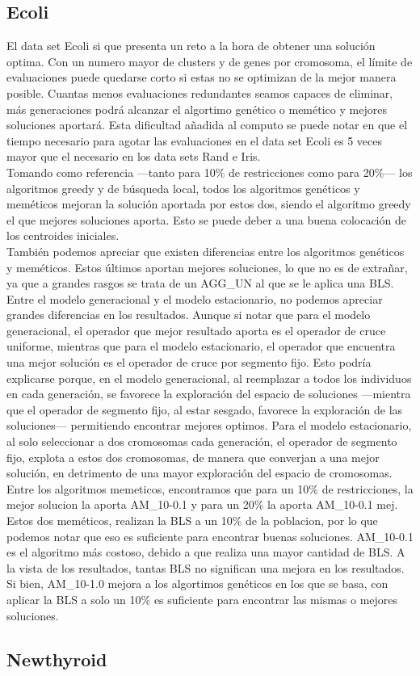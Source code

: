 \subsection{Ecoli}
El data set Ecoli si que presenta un reto a la hora de obtener una solución optima. Con un numero mayor de clusters y de genes por cromosoma, el límite de evaluaciones puede quedarse corto si estas no se optimizan de la mejor manera posible. Cuantas menos evaluaciones redundantes seamos capaces de eliminar, más generaciones podrá alcanzar el algortimo genético o memético y mejores soluciones aportará. Esta dificultad añadida al computo se puede notar en que el tiempo necesario para agotar las evaluaciones en el data set Ecoli es 5 veces mayor que el necesario en los data sets Rand e Iris.
\\
Tomando como referencia ---tanto para 10\% de restricciones como para 20\%--- los algoritmos greedy y de búsqueda local, todos los algoritmos genéticos y meméticos mejoran la solución aportada por estos dos, siendo el algoritmo greedy el que mejores soluciones aporta. Esto se puede deber a una buena colocación de los centroides iniciales.
\\
También podemos apreciar que existen diferencias entre los algoritmos genéticos y meméticos. Estos últimos aportan mejores soluciones, lo que no es de extrañar, ya que a grandes rasgos se trata de un AGG\_UN al que se le aplica una BLS.
Entre el modelo generacional y el modelo estacionario, no podemos apreciar grandes diferencias en los resultados. Aunque si notar que para el modelo generacional, el operador que mejor resultado aporta es el operador de cruce uniforme, mientras que para el modelo estacionario, el operador que encuentra una mejor solución es el operador de cruce por segmento fijo.
Esto podría explicarse porque, en el modelo generacional, al reemplazar a todos los individuos en cada generación, se favorece la exploración del espacio de soluciones ---mientra que el operador de segmento fijo, al estar sesgado, favorece la exploración de las soluciones--- permitiendo encontrar mejores optimos. Para el modelo estacionario, al solo seleccionar a dos cromosomas cada generación, el operador de segmento fijo, explota a estos dos cromosomas, de manera que converjan a una mejor solución, en detrimento de una mayor exploración del espacio de cromosomas.
\\
Entre los algoritmos memeticos, encontramos que para un 10\% de restricciones, la mejor solucion la aporta AM\_10-0.1 y para un 20\% la aporta AM\_10-0.1 mej.
Estos dos meméticos, realizan la BLS a un 10\% de la poblacion, por lo que podemos notar que eso es suficiente para encontrar buenas soluciones. AM\_10-0.1 es el algoritmo más costoso, debido a que realiza una mayor cantidad de BLS. A la vista de los resultados, tantas BLS no significan una mejora en los resultados. Si bien, AM\_10-1.0 mejora a los algortimos genéticos en los que se basa, con aplicar la BLS a solo un 10\% es suficiente para encontrar las mismas o mejores soluciones.


\subsection{Newthyroid}
